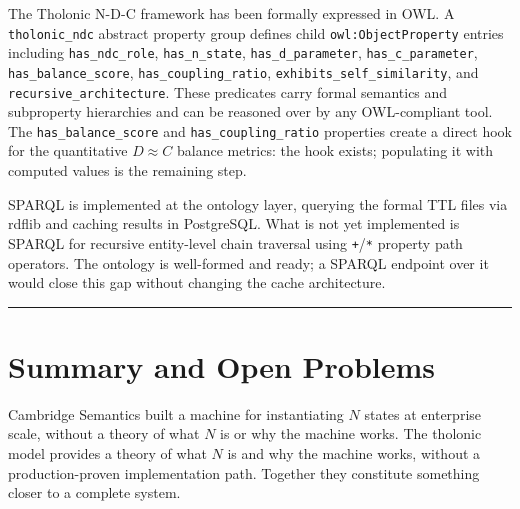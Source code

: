 \documentclass[12pt]{article}
\begin{document}
The Tholonic N-D-C framework has been formally expressed in OWL. A
\texttt{tholonic\_ndc} abstract property group defines child
\texttt{owl:ObjectProperty} entries including \texttt{has\_ndc\_role},
\texttt{has\_n\_state}, \texttt{has\_d\_parameter},
\texttt{has\_c\_parameter}, \texttt{has\_balance\_score},
\texttt{has\_coupling\_ratio}, \texttt{exhibits\_self\_similarity}, and
\texttt{recursive\_architecture}. These predicates carry formal
semantics and subproperty hierarchies and can be reasoned over by any
OWL-compliant tool. The \texttt{has\_balance\_score} and
\texttt{has\_coupling\_ratio} properties create a direct hook for the
quantitative \(D \approx C\) balance metrics: the hook exists;
populating it with computed values is the remaining step.

SPARQL is implemented at the ontology layer, querying the formal TTL
files via rdflib and caching results in PostgreSQL. What is not yet
implemented is SPARQL for recursive entity-level chain traversal using
\texttt{+}/\texttt{*} property path operators. The ontology is
well-formed and ready; a SPARQL endpoint over it would close this gap
without changing the cache architecture.

\begin{center}\rule{0.5\linewidth}{0.5pt}\end{center}

\section{Summary and Open Problems}\label{summary-and-open-problems}

Cambridge Semantics built a machine for instantiating \(N\) states at
enterprise scale, without a theory of what \(N\) is or why the machine
works. The tholonic model provides a theory of what \(N\) is and why the
machine works, without a production-proven implementation path. Together
they constitute something closer to a complete system.
\end{document}
